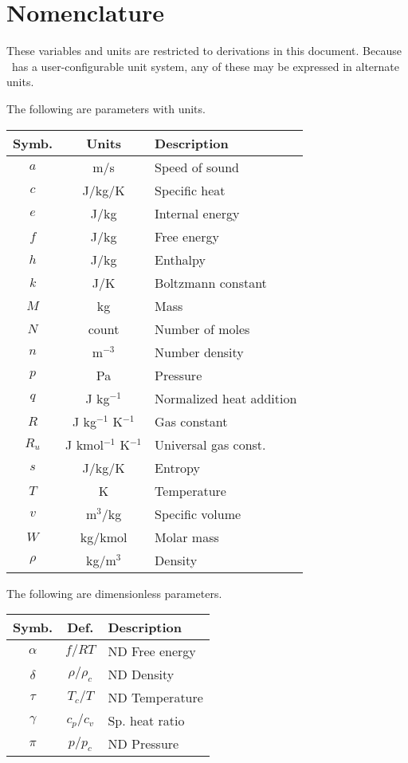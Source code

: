\section*{Nomenclature}

These variables and units are restricted to derivations in this document.  Because \PM\ has a user-configurable unit system, any of these may be expressed in alternate units.  

The following are parameters with units.

\vspace{1em}
\begin{tabular}{|ccl|}
\hline
Symb. & Units & Description\\
\hline
$a$ & m/s & Speed of sound\\
$c$ & J/kg/K & Specific heat\\
$e$ & J/kg & Internal energy\\
$f$ & J/kg & Free energy\\
$h$ & J/kg & Enthalpy\\
$k$ & J/K & Boltzmann constant\\
$M$ & kg & Mass\\
$N$ & count & Number of moles\\
$n$ & m$^{-3}$ & Number density\\
$p$ & Pa & Pressure\\
$q$ & J kg$^{-1}$ & Normalized heat addition\\
$R$ & J kg$^{-1}$ K$^{-1}$ & Gas constant\\
$R_u$ & J kmol$^{-1}$ K$^{-1}$ & Universal gas const.\\
$s$ & J/kg/K & Entropy\\
$T$ & K & Temperature\\
$v$ & m$^3$/kg & Specific volume\\
$W$ & kg/kmol & Molar mass\\
$\rho$ & kg/m$^3$ & Density\\
\hline
\end{tabular}
\vspace{1em}

The following are dimensionless parameters.

\vspace{1em}
\begin{tabular}{|ccl|}
\hline
Symb. & Def. & Description\\
\hline
$\alpha$ & $f / RT$ & ND Free energy\\
$\delta$ & $\rho/\rho_c$ & ND Density\\
$\tau$ & $T_c / T$ & ND Temperature\\
$\gamma$ & $c_p / c_v$ & Sp. heat ratio\\
$\pi$ & $p / p_c$ & ND Pressure\\
\hline
\end{tabular}
\vspace{1em}

